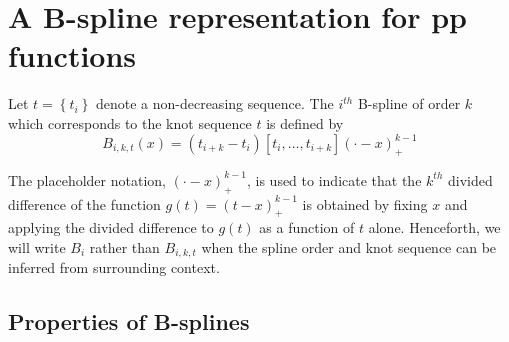 \documentclass[12pt]{article}
\newenvironment{definition}[1][Definition]{\begin{trivlist}
\item[\hskip \labelsep {\bfseries #1}]}{\end{trivlist}}
\begin{document}
\section{A B-spline representation for pp functions}

\begin{definition} \label{definition:order_k_Bspline}
Let $t= \left\{ t_i \right\}$ denote a non-decreasing sequence. The $i^{th}$ B-spline of order $k$ which corresponds to the knot sequence $t$ is defined by 
\begin{equation} \label{eq:bspline_definition}
B_{i,k,t}\left(x\right) = \left(t_{i+k}-t_i\right)\left[t_i,\dots,t_{i+k}\right]\left(\cdot -x\right)_+^{k-1}
\end{equation}
\end{definition}

The placeholder notation, $\left(\cdot - x\right)_+^{k-1}$, is used to indicate that the $k^{th}$ divided difference of the function $g\left(t \right) = \left(t-x\right)^{k-1}_+$ is obtained by fixing $x$ and applying the divided difference to $g\left(t \right)$ as a function of $t$ alone. Henceforth, we will write $B_i$ rather than $B_{i,k,t}$ when the spline order and knot sequence can be inferred from surrounding context.

\subsection{Properties of B-splines}
\end{document}
